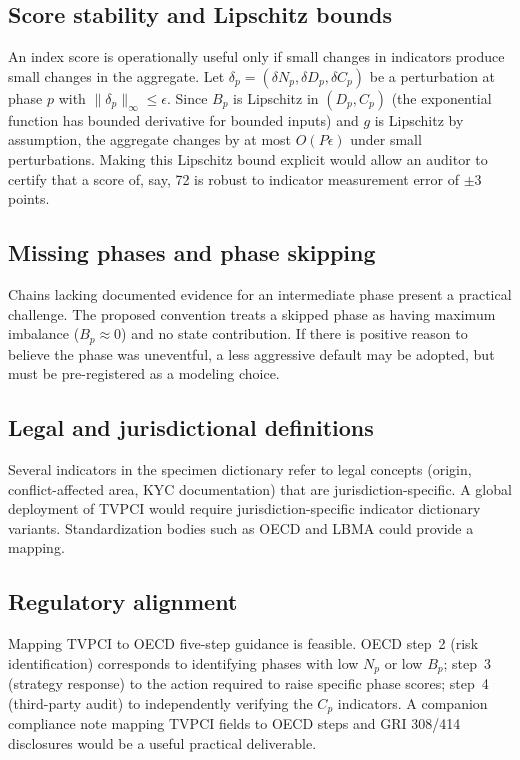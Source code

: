 \documentclass[12pt]{article}
\theoremstyle{remark}
\begin{document}
\subsection{Score stability and Lipschitz bounds}

An index score is operationally useful only if small changes in indicators produce small
changes in the aggregate.  Let $\delta_p = (\delta N_p, \delta D_p, \delta C_p)$ be a
perturbation at phase $p$ with $\|\delta_p\|_\infty \leq \epsilon$.  Since $B_p$ is
Lipschitz in $(D_p, C_p)$ (the exponential function has bounded derivative for bounded
inputs) and $g$ is Lipschitz by assumption, the aggregate changes by at most
$O(P\epsilon)$ under small perturbations.  Making this Lipschitz bound explicit would
allow an auditor to certify that a score of, say, 72 is robust to indicator measurement
error of $\pm 3$ points.

\subsection{Missing phases and phase skipping}

Chains lacking documented evidence for an intermediate phase present a practical
challenge.  The proposed convention treats a skipped phase as having maximum imbalance
($B_p \approx 0$) and no state contribution.  If there is positive reason to believe
the phase was uneventful, a less aggressive default may be adopted, but must be
pre-registered as a modeling choice.

\subsection{Legal and jurisdictional definitions}

Several indicators in the specimen dictionary refer to legal concepts (origin,
conflict-affected area, KYC documentation) that are jurisdiction-specific.  A global
deployment of TVPCI would require jurisdiction-specific indicator dictionary variants.
Standardization bodies such as OECD and LBMA could provide a mapping.

\subsection{Regulatory alignment}

Mapping TVPCI to OECD five-step guidance \cite{OECD2016} is feasible.  OECD step~2
(risk identification) corresponds to identifying phases with low $N_p$ or low $B_p$;
step~3 (strategy response) to the action required to raise specific phase scores;
step~4 (third-party audit) to independently verifying the $C_p$ indicators.  A
companion compliance note mapping TVPCI fields to OECD steps and GRI 308/414
disclosures \cite{GRI308,GRI414} would be a useful practical deliverable.
\end{document}

